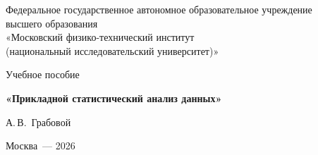 \begin{titlepage}
    \centering
    \vspace*{0.5cm}
    {\small
    Федеральное государственное автономное образовательное учреждение\\
    высшего образования\\
    «Московский физико-технический институт\\
    (национальный исследовательский университет)»\par}
    \vfill
    Учебное пособие\par
    \vspace{1.2cm}
    {\bfseries\large «Прикладной статистический анализ данных»\par}
    \vspace{1.2cm}
    А.\,В.~Грабовой\par
    \vfill
    Москва~--- 2026\par
\end{titlepage}
